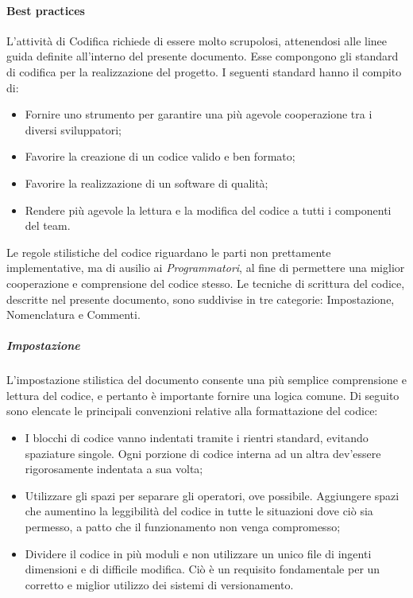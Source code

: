 		\paragraph{Best practices}
		L'attività di Codifica richiede di essere molto scrupolosi, attenendosi alle linee guida definite all'interno del presente documento. Esse compongono gli standard di codifica per la realizzazione del progetto. I seguenti standard hanno il compito di:
		\begin{itemize}
			\item Fornire uno strumento per garantire una più agevole cooperazione tra i diversi sviluppatori;
			\item Favorire la creazione di un codice valido e ben formato;
			\item Favorire la realizzazione di un software di qualità;
			\item Rendere più agevole la lettura e la modifica del codice a tutti i componenti del team.
		\end{itemize}
		Le regole stilistiche del codice riguardano le parti non prettamente implementative, ma di ausilio ai \textit{Programmatori}, al fine di permettere una miglior cooperazione e comprensione del codice stesso. Le tecniche di scrittura del codice, descritte nel presente documento, sono suddivise in tre categorie: Impostazione, Nomenclatura e Commenti.
	
			\subparagraph{Impostazione}
			L'impostazione stilistica del documento consente una più semplice comprensione e lettura del codice, e pertanto è importante fornire una logica comune. Di seguito sono elencate le principali convenzioni relative alla formattazione del codice: 
			\begin{itemize}
				\item I blocchi di codice vanno indentati tramite i rientri standard, evitando spaziature singole. Ogni porzione di codice interna ad un altra dev'essere rigorosamente indentata a sua volta;
				\item Utilizzare gli spazi per separare gli operatori, ove possibile. Aggiungere spazi che aumentino la leggibilità del codice in tutte le situazioni dove ciò sia permesso, a patto che il funzionamento non venga compromesso;
				\item Dividere il codice in più moduli e non utilizzare un unico file di ingenti dimensioni e di difficile modifica. Ciò è un requisito fondamentale per un corretto e miglior utilizzo dei sistemi di versionamento.
			\end{itemize}
	

